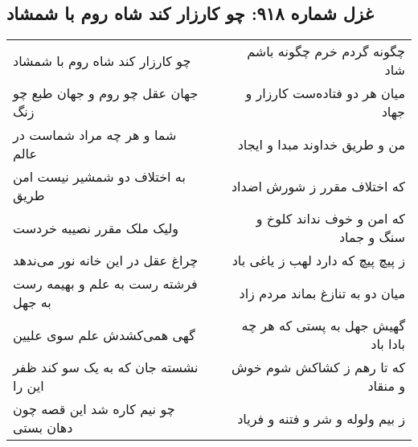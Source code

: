 \begin{center}
\section*{غزل شماره ۹۱۸: چو کارزار کند شاه روم با شمشاد}
\label{sec:0918}
\begin{longtable}{l p{0.5cm} r}
چو کارزار کند شاه روم با شمشاد
&&
چگونه گردم خرم چگونه باشم شاد
\\
جهان عقل چو روم و جهان طبع چو زنگ
&&
میان هر دو فتاده‌ست کارزار و جهاد
\\
شما و هر چه مراد شماست در عالم
&&
من و طریق خداوند مبدا و ایجاد
\\
به اختلاف دو شمشیر نیست امن طریق
&&
که اختلاف مقرر ز شورش اضداد
\\
ولیک ملک مقرر نصیبه خردست
&&
که امن و خوف نداند کلوخ و سنگ و جماد
\\
چراغ عقل در این خانه نور می‌ندهد
&&
ز پیچ پیچ که دارد لهب ز یاغی باد
\\
فرشته رست به علم و بهیمه رست به جهل
&&
میان دو به تنازغ بماند مردم زاد
\\
گهی همی‌کشدش علم سوی علیین
&&
گهیش جهل به پستی که هر چه بادا باد
\\
نشسته جان که به یک سو کند ظفر این را
&&
که تا رهم ز کشاکش شوم خوش و منقاد
\\
چو نیم کاره شد این قصه چون دهان بستی
&&
ز بیم ولوله و شر و فتنه و فریاد
\\
\end{longtable}
\end{center}
